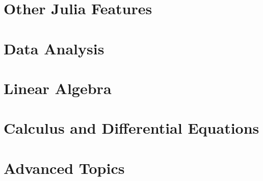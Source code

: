 \documentclass[display=portrait]{mathbook}
\theoremstyle{plain}
\begin{document}



% 
% 

\part{Other Julia Features}





\part{Data Analysis}



\part{Linear Algebra}




\part{Calculus and Differential Equations}





\part{Advanced Topics}

\appendix




%


  
\end{document}
